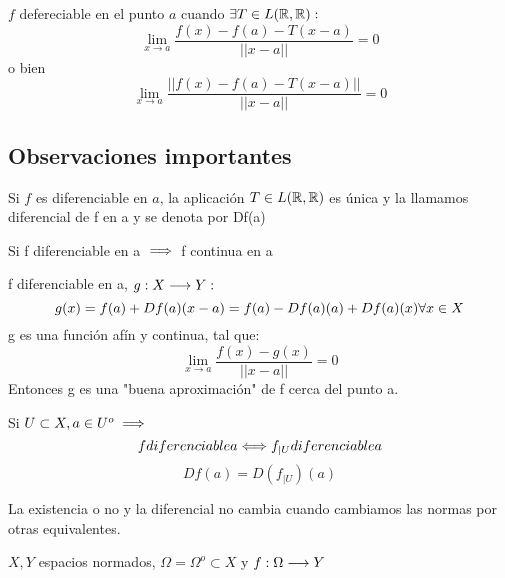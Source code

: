 \begin{definicion}
    $f$ defereciable en el punto $a$ cuando $\exists T \in L(\mathbb R,\mathbb R):$
    $$\lim_{x\to a} \frac{f(x)-f(a)- T (x-a)}{||x-a||} = 0$$ o bien
    $$\lim_{x\to a} \frac{||f(x)-f(a)- T (x-a)||}{||x-a||} = 0$$
\end{definicion}

\subsection{Observaciones importantes}

\begin{prop}[Unicidad]
    Si $f$ es diferenciable en $a$, la aplicación $T\in L(\mathbb R,\mathbb R)$ es única y la llamamos diferencial de f en a y se denota por Df(a)
\end{prop}

\begin{prop}
    Si f diferenciable en a $\implies $ f continua en a 
\end{prop}

\begin{prop}
    f diferenciable en a, $g:X \longrightarrow Y:$ 
    $$g(x) = f(a) + Df(a)(x-a) = f(a) - Df(a)(a) + Df(a)(x) \\\forall x \in X$$
    g es una función afín y continua, tal que:
    $$\lim_{x\to a}\frac{f(x)-g(x)}{||x-a||} = 0$$
    Entonces g es una "buena aproximación" de f cerca del punto a.
\end{prop}

\begin{prop}
    Si $U\subset X, a\in U^o \implies $ 
    $$f \\ diferenciable \\ a \\ \Longleftrightarrow \\ f_{|U} \\ diferenciable\\ a$$
    $$Df(a) = D(f_{|U})(a)$$
\end{prop}

\begin{prop}
    La existencia o no y la diferencial no cambia cuando cambiamos las normas por otras equivalentes.
\end{prop}

\begin{notacion}
    $X,Y$ espacios normados, $\Omega = \Omega^o \subset X$ y $f:\Omega \longrightarrow Y$
\end{notacion}

